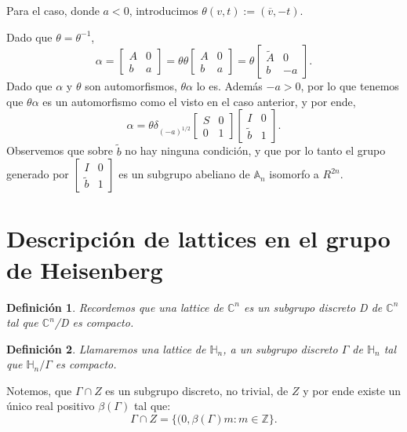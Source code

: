 \documentclass[12pt]{article}
\newtheorem{definition}{Definición}
\begin{document}
Para el caso, donde $a<0$, introducimos $\theta(v,t):=(\overline{v},-t)$.

Dado que $\theta=\theta^{-1}$,
$$\alpha=
\begin{bmatrix}
A & 0\\
b & a
\end{bmatrix}=
\theta 
\theta
\begin{bmatrix}
A & 0\\
b & a
\end{bmatrix}=
\theta
\begin{bmatrix}
\tilde{A} & 0\\
b & -a
\end{bmatrix}.
$$
Dado que $\alpha$ y $\theta$ son automorfismos, $\theta \alpha$ lo es. Además $-a>0$, por lo que tenemos que $\theta \alpha$ es 
un automorfismo como el visto en el caso anterior, y por ende,
$$\alpha=
\theta
\delta_{(-a)^{1/2}}
\begin{bmatrix}
S & 0\\
0 & 1
\end{bmatrix}
\begin{bmatrix}
I & 0\\
\tilde{b} & 1
\end{bmatrix}.
$$
Observemos que sobre $\tilde{b}$ no hay ninguna condición, y que por lo tanto el grupo generado por
$\begin{bmatrix}
I & 0\\
\tilde{b} & 1
\end{bmatrix}
$
es un subgrupo abeliano de $\mathbb{A}_n$ isomorfo a $R^{2n}$.

\section{Descripción de lattices en el grupo de Heisenberg}

\begin{definition}
 Recordemos que una lattice de $\mathbb{C}^n$ es un subgrupo discreto D de $\mathbb{C}^n$ tal que $\mathbb{C}^n$/D es compacto.
\end{definition}

\begin{definition}
 Llamaremos una lattice de $\mathbb{H}_n$, a un subgrupo discreto $\Gamma$ de $\mathbb{H}_n$ tal que $\mathbb{H}_n/\Gamma$ es compacto.
\end{definition}

Notemos, que  $\Gamma \cap Z$ es un subgrupo discreto, no trivial, de $Z$ y 
por ende existe un único real positivo $\beta(\Gamma)$ tal que:
$$
\Gamma \cap Z=\{(0,\beta(\Gamma) m : m \in \mathbb{Z}\}.
$$
\end{document}
